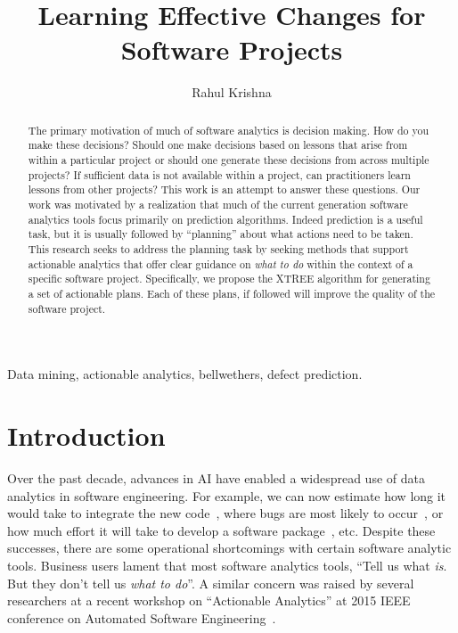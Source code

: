 \documentclass[conference]{IEEEtran}
\begin{document}
\title{Learning Effective Changes for  Software Projects\\[-0.8cm]}
\author{Rahul Krishna\\
}

\maketitle


\begin{abstract}

The primary motivation of much of software analytics is decision making. How do you make these decisions? Should one make decisions based on lessons that arise from within a particular project or should one generate these decisions from across multiple projects? If sufficient data is not available within a project, can practitioners learn lessons from other projects? This work is an attempt to answer these questions. Our work was motivated by a realization that much of the current generation software analytics tools focus primarily on prediction algorithms. Indeed prediction is a useful task, but it is usually followed by ``planning'' about what actions need to be taken. This research seeks to address the planning task by seeking methods that support actionable analytics that offer clear guidance on \textit{what to do} within the context of a specific software project. Specifically, we propose the XTREE algorithm for generating a set of actionable plans. Each of these plans, if followed will improve the quality of the software project.

\end{abstract}

\begin{IEEEkeywords}
Data mining, actionable analytics, bellwethers, defect prediction.
\end{IEEEkeywords}


\section{Introduction}

Over the past decade, advances in AI have enabled a widespread use of data analytics in software engineering. For example, we can now estimate	how long it would take to integrate the new code~\cite{czer11}, where bugs are most likely to occur~\cite{ostrand04,Menzies2007a}, or how much effort it will take to develop a software package~\cite{turhan11,koc11b}, etc. Despite these successes, there are some operational shortcomings with certain software analytic tools.  Business users lament that most software analytics tools, ``Tell us what \textit{is}. But they don't tell us \textit{what to do}''. A similar concern was raised by several researchers at a recent workshop on ``Actionable Analytics'' at 2015 IEEE conference on Automated Software Engineering~\cite{hihn15}. 
\end{document}
